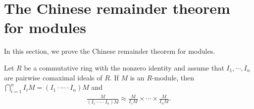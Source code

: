 \section{The Chinese remainder theorem for modules}

In this section, we prove the Chinese remainder theorem for modules.
\begin{thm}\label{CRT for modules}
    Let $R$ be a commutative ring with the nonzero identity and assume that $I_1, \cdots, I_n$ are pairwise comaximal ideals of $R$.
    If $M$ is an $R$-module, then $\bigcap_{i=1}^n I_iM=(I_1\cdot\cdots\cdot I_n)M$ and
    \begin{align*}
        \frac{M}{(I_1\cdot\cdots\cdot I_n)M}\approx\frac{M}{I_1 M}\times\cdots\times\frac{M}{I_n M}.
    \end{align*}
\end{thm}

